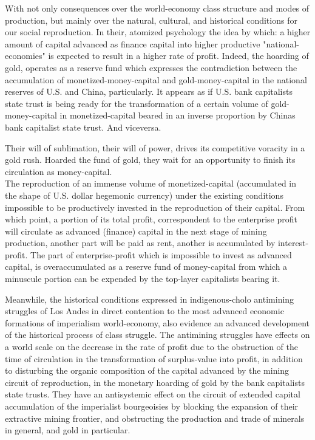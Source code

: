 \documentclass[
]{article}
\begin{document}
With not only consequences over the world-economy class structure and
modes of production, but mainly over the natural, cultural, and
historical conditions for our social reproduction. In their, atomized
psychology the idea by which: a higher amount of capital advanced as
finance capital into higher productive "national-economies" is expected
to result in a higher rate of profit. Indeed, the hoarding of gold,
operates as a reserve fund which expresses the contradiction between the
accumulation of monetized-money-capital and gold-money-capital in the
national reserves of U.S. and China, particularly. It appears as if U.S.
bank capitalists state trust is being ready for the transformation of a
certain volume of gold-money-capital in monetized-capital beared in an
inverse proportion by China\textquotesingle s bank capitalist state
trust. And viceversa.

Their will of sublimation, their will of power, drives its competitive
voracity in a gold rush. Hoarded the fund of gold, they wait for an
opportunity to finish its circulation as money-capital.\\
The reproduction of an immense volume of monetized-capital (accumulated
in the shape of U.S. dollar hegemonic currency) under the existing
conditions impossible to be productively invested in the reproduction of
their capital. From which point, a portion of its total profit,
correspondent to the enterprise profit will circulate as advanced
(finance) capital in the next stage of mining production, another part
will be paid as rent, another is accumulated by interest-profit. The
part of enterprise-profit which is impossible to invest as advanced
capital, is overaccumulated as a reserve fund of money-capital from
which a minuscule portion can be expended by the top-layer capitalists
bearing it.

Meanwhile, the historical conditions expressed in indigenous-cholo
antimining struggles of Los Andes in direct contention to the most
advanced economic formations of imperialism world-economy, also evidence
an advanced development of the historical process of class struggle. The
antimining struggles have effects on a world scale on the decrease in
the rate of profit due to the obstruction of the time of circulation in
the transformation of surplus-value into profit, in addition to
disturbing the organic composition of the capital advanced by the mining
circuit of reproduction, in the monetary hoarding of gold by the bank
capitalists state trusts. They have an antisystemic effect on the
circuit of extended capital accumulation of the imperialist bourgeoisies
by blocking the expansion of their extractive mining frontier, and
obstructing the production and trade of minerals in general, and gold in
particular.
\end{document}
